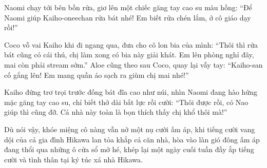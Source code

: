 ﻿\documentclass[../main.tex]{subfiles}
\begin{document}
Naomi chạy tới bên bồn rửa, giơ lên một chiếc găng tay cao su màu hồng: ``Để Naomi giúp Kaiho-oneechan rửa bát nhé! Em biết rửa chén lắm, ở cô giáo dạy rồi!''

Coco vỗ vai Kaiho khi đi ngang qua, đưa cho cô lon bia của mình: ``Thôi thì rửa bát cũng có cái thú, chị làm xong có bia này giải khát. Em lên phòng nghỉ đây, mai còn phải stream sớm.'' Aloe cũng theo sau Coco, quay lại vẫy tay: ``Kaiho-san cố gắng lên! Em mang quần áo sạch ra giùm chị mai nhé!''

Kaiho đứng trơ trọi trước đống bát đĩa cao như núi, nhìn Naomi đang hào hứng mặc găng tay cao su, chỉ biết thở dài bất lực rồi cười: ``Thôi được rồi, có Nao giúp thì cũng đỡ. Cả nhà này toàn là bọn thích thấy chị khổ thôi mà!''

Dù nói vậy, khóe miệng cô nàng vẫn nở một nụ cười ấm áp, khi tiếng cười vang dội của cả gia đình Hikawa lan tỏa khắp cả căn nhà, hòa vào làn gió đông ấm áp đang thổi qua những ô cửa sổ mở hé, khép lại một ngày cuối tuần đầy ắp tiếng cười và tình thân tại ký túc xá nhà Hikawa.
\end{document}
